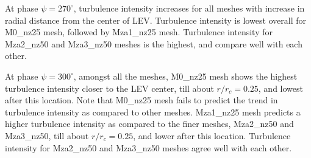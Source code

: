 At phase $\psi = 270^\circ$, turbulence intensity increases for all meshes with increase in radial distance from the center of LEV.
Turbulence intensity is lowest overall for M0\_nz25 mesh, followed by Mza1\_nz25 mesh. Turbulence intensity for Mza2\_nz50 and Mza3\_nz50 meshes is the highest, and compare well with each other.

At phase $\psi = 300^\circ$, amongst all the meshes, M0\_nz25 mesh shows the highest turbulence intensity closer to the LEV center, till about $r/r_c = 0.25$, and lowest after this location.
Note that M0\_nz25 mesh fails to predict the trend in turbulence intensity as compared to other meshes.
Mza1\_nz25 mesh predicts a higher turbulence intensity as compared to the finer meshes, Mza2\_nz50 and Mza3\_nz50, till about $r/r_c = 0.25$, and lower after this location.
Turbulence intensity for Mza2\_nz50 and Mza3\_nz50 meshes agree well with each other. 


